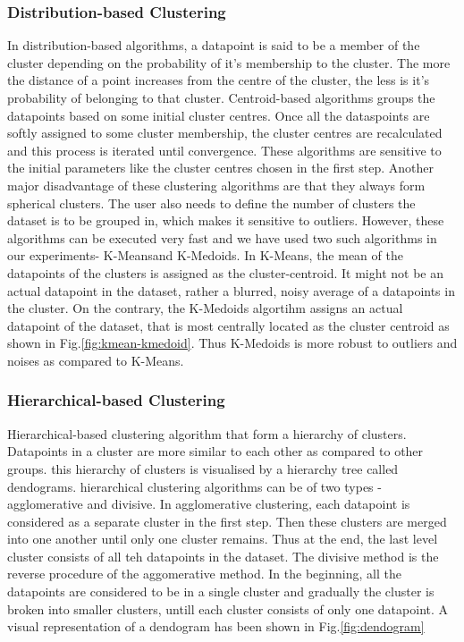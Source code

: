 \subsubsection{Distribution-based Clustering}
In distribution-based algorithms, a datapoint is said to be a member of the cluster depending on the probability of it's membership to the cluster. The more the distance of a point increases from the centre of the cluster, the less is it's probability of belonging to that cluster. Centroid-based algorithms groups the datapoints based on some initial cluster centres. Once all the dataspoints are softly assigned to some cluster membership, the cluster centres are recalculated and this process is iterated until convergence. These algorithms are sensitive to the initial parameters like the cluster centres chosen in the first step. Another major disadvantage of these clustering algorithms are that they always form spherical clusters. The user also needs to define the number of clusters the dataset is to be grouped in, which makes it sensitive to outliers. However, these algorithms can be executed very fast and we have used two such algorithms in our experiments- K-Means\cite*{kmeans}and K-Medoids\cite*{kmedoids}. In K-Means, the mean of the datapoints of the clusters is assigned as the cluster-centroid. It might not be an actual datapoint in the dataset, rather a blurred, noisy average of a datapoints in the cluster. On the contrary, the K-Medoids algortihm assigns an actual datapoint of the dataset, that is most centrally located as the cluster centroid as shown in Fig.\ref*{fig:kmean-kmedoid}. Thus K-Medoids is more robust to outliers and noises as compared to K-Means.

\subsubsection{Hierarchical-based Clustering}
Hierarchical-based clustering algorithm that form a hierarchy of clusters. Datapoints in a cluster are more similar to each other as compared to other groups. this hierarchy of clusters is visualised by a hierarchy tree called dendograms. hierarchical clustering algorithms can be of two types - agglomerative and divisive. In agglomerative clustering, each datapoint is considered as a separate cluster in the first step. Then these clusters are merged into one another until only one cluster remains. Thus at the end, the last level cluster consists of all teh datapoints in the dataset. The divisive method is the reverse procedure of the aggomerative method. In the beginning, all the datapoints are considered to be in a single cluster and gradually the cluster is broken into smaller clusters, untill each cluster consists of only one datapoint. A visual representation of a dendogram has been shown in Fig.\ref*{fig:dendogram}

